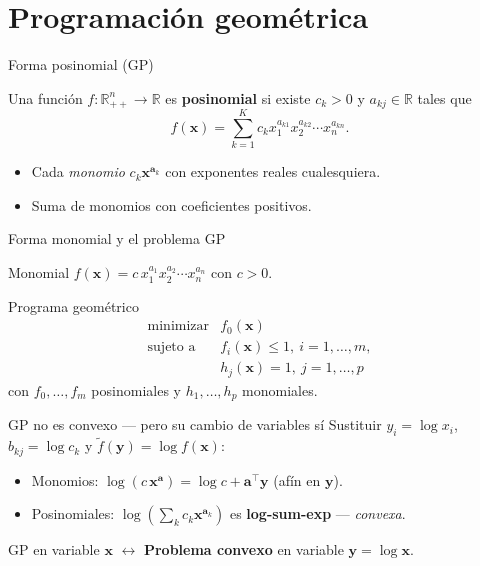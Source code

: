 \documentclass[10pt,aspectratio=169]{beamer}
\newcommand{\R}{\mathbb{R}}
\newcommand{\x}{\mathbf{x}}
\newcommand{\y}{\mathbf{y}}
\newcommand{\0}{\mathbf{0}}
\begin{document}
\section{Programación geométrica}
\begin{frame}{Forma posinomial (GP)}
  \begin{block}{}
    Una función $f:\R^n_{++}\to\R$ es \textbf{posinomial} si existe
    $c_k>0$ y $a_{kj}\in\R$ tales que
    \[
      f(\x)=\sum_{k=1}^{K}c_k x_1^{a_{k1}}x_2^{a_{k2}}\cdots x_n^{a_{kn}}.
    \]
  \end{block}
  \begin{itemize}
    \item Cada \emph{monomio} $c_k \x^{\mathbf{a}_k}$ con exponentes reales
      cualesquiera.
    \item Suma de monomios con coeficientes positivos.
  \end{itemize}
\end{frame}

\begin{frame}{Forma monomial y el problema GP}
  \begin{block}{Monomial}
    $f(\x)=c\,x_1^{a_1}x_2^{a_2}\cdots x_n^{a_n}$ con $c>0$.
  \end{block}
  \begin{block}{Programa geométrico}
    \[
      \begin{array}{ll}
        \text{minimizar} & f_0(\x) \\
        \text{sujeto a}  & f_i(\x)\le 1,\ i=1,\dots,m,\\
                         & h_j(\x)=1,\ j=1,\dots,p
      \end{array}
    \]
    con $f_0,\dots,f_m$ posinomiales y $h_1,\dots,h_p$ monomiales.
  \end{block}
\end{frame}

\begin{frame}{GP no es convexo --- pero su cambio de variables sí}
  Sustituir $y_i=\log x_i$, $b_{kj}=\log c_k$ y
  $\tilde f(\y)=\log f(\x)$:
  \begin{itemize}
    \item Monomios: $\log(c\,\x^{\mathbf{a}})=\log c + \mathbf{a}^\top\y$ \quad(afín en $\y$).
    \item Posinomiales: $\log\!\left(\sum_k c_k\x^{\mathbf{a}_k}\right)$
      es \textbf{log-sum-exp} --- \emph{convexa}.
  \end{itemize}
  \begin{alertblock}{}
    GP en variable $\x$ \quad $\longleftrightarrow$ \quad
    \textbf{Problema convexo} en variable $\y=\log\x$.
  \end{alertblock}
\end{frame}
\end{document}
